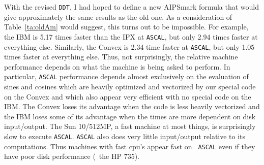 With the revised {\tt DDT}, I had hoped to define a new AIPSmark
formula that would give approximately the same results as the old one.
As a consideration of Table~\ref{ta:oldAm} would suggest, this turns
out to be impossible.  For example, the IBM is 5.17 times faster than
the IPX at {\tt ASCAL}, but only 2.94 times faster at everything else.
Similarly, the Convex is 2.34 time faster at {\tt ASCAL}, but only
1.05 times faster at everything else.  Thus, not surprisingly, the
relative machine performance depends on what the machine is being
asked to perform.  In particular, {\tt ASCAL} performance depends
almost exclusively on the evaluation of sines and cosines which are
heavily optimized and vectorized by our special code on the Convex and
which also appear very efficient with no special code on the IBM.  The
Convex loses its advantage when the code is less heavily vectorized
and the IBM loses some of its advantage when the times are more
dependent on disk input/output.  The Sun 10/512MP, a fast machine at
most things, is surprisingly slow to execute \hbox{{\tt ASCAL}}.
{\tt ASCAL} also does very little input/output relative to its
computations.  Thus machines with fast cpu's appear fast on {\tt
ASCAL} even if they have poor disk performance (\ie\ the HP 735).

